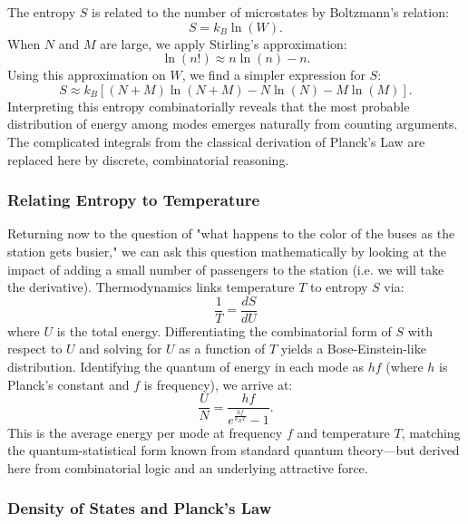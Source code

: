 \documentclass{report}
\begin{document}
The entropy $S$ is related to the number of microstates by Boltzmann’s relation:
\[
S = k_B \ln(W).
\]
\newline
When $N$ and $M$ are large, we apply Stirling’s approximation:
\[
\ln(n!) \approx n \ln(n) - n.
\]
Using this approximation on $W$, we find a simpler expression for $S$:
\[
S \approx k_B \left[ (N+M)\ln(N+M) - N\ln(N) - M\ln(M)\right].
\]
\newline
Interpreting this entropy combinatorially reveals that the most probable distribution of energy among modes emerges naturally from counting arguments. The complicated integrals from the classical derivation of Planck’s Law are replaced here by discrete, combinatorial reasoning.

\subsubsection*{Relating Entropy to Temperature}
Returning now to the question of "what happens to the color of the buses as the station gets busier," we can ask this question mathematically by looking at the impact of adding a small number of passengers to the station  (i.e. we will take the derivative). Thermodynamics links temperature $T$ to entropy $S$ via:
\[
\frac{1}{T} = \frac{dS}{dU}
\]
where $U$ is the total energy. Differentiating the combinatorial form of $S$ with respect to $U$ and solving for $U$ as a function of $T$ yields a Bose-Einstein-like distribution. Identifying the quantum of energy in each mode as $hf$ (where $h$ is Planck’s constant and $f$ is frequency), we arrive at:
\[
\frac{U}{N} = \frac{hf}{e^{\frac{hf}{k_B T}} - 1}.
\]
\newline
This is the average energy per mode at frequency $f$ and temperature $T$, matching the quantum-statistical form known from standard quantum theory—but derived here from combinatorial logic and an underlying attractive force.

\subsubsection*{Density of States and Planck’s Law}
\end{document}
